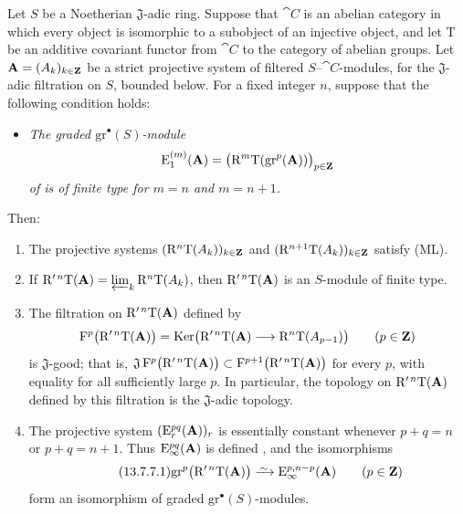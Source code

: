 \begin{proposition}[13.7.7]
\label{0.13.7.7}
Let $S$ be a Noetherian $\mathfrak{J}$-adic ring.
Suppose that $\cat{C}$ is an abelian category in which every object
is isomorphic to a subobject of an injective object, and let
$\mathrm{T}$ be an additive covariant functor from $\cat{C}$ to the
category of abelian groups.
Let $\mathbf{A}=(A_k)_{k\in\mathbf{Z}}$ be a
strict projective system of filtered $S$--$\cat{C}$-modules, for the $\mathfrak{J}$-adic
filtration on $S$, bounded below.
For a fixed integer $n$, suppose that the following condition holds:
\begin{itemize}
  \item[$(\mathrm{F}_n)$]
  \emph{The graded $\mathrm{gr}^\bullet(S)$-module}
  \[
    \mathrm{E}_1^{(m)}(\mathbf{A})
    =
    \bigl(
      \mathrm{R}^m\mathrm{T}(\mathrm{gr}^p(\mathbf{A}))
    \bigr)_{p\in\mathbf{Z}}
  \]
  \emph{of  is of finite type for
  $m=n$ and $m=n+1$.}
\end{itemize}
Then:
\begin{enumerate}
  \item[{\rm(i)}] The projective systems
  $(\mathrm{R}^n\mathrm{T}(A_k))_{k\in\mathbf{Z}}$ and
  $(\mathrm{R}^{n+1}\mathrm{T}(A_k))_{k\in\mathbf{Z}}$ satisfy {\rm(ML)}.
  \item[{\rm(ii)}] If $\mathrm{R}'^{\,n}\mathrm{T}(\mathbf{A})
=
\varprojlim_k\mathrm{R}^n\mathrm{T}(A_k)$,
  then $\mathrm{R}'^{\,n}\mathrm{T}(\mathbf{A})$ is an $S$-module of finite
  type.
  \item[{\rm(iii)}] The filtration on
  $\mathrm{R}'^{\,n}\mathrm{T}(\mathbf{A})$ defined by
  \[
    \mathrm{F}^p\bigl(\mathrm{R}'^{\,n}\mathrm{T}(\mathbf{A})\bigr)
    =
    \operatorname{Ker}\bigl(
      \mathrm{R}'^{\,n}\mathrm{T}(\mathbf{A})
      \longrightarrow
      \mathrm{R}^n\mathrm{T}(A_{p-1})
    \bigr)
    \qquad(p\in\mathbf{Z})
  \]
  is $\mathfrak{J}$-good; that is, $\mathfrak{J}\,
\mathrm{F}^p\bigl(\mathrm{R}'^{\,n}\mathrm{T}(\mathbf{A})\bigr)
\subset
\mathrm{F}^{p+1}\bigl(\mathrm{R}'^{\,n}\mathrm{T}(\mathbf{A})\bigr)$
  for every $p$, with equality for all sufficiently large $p$.
  In particular, the topology on
  $\mathrm{R}'^{\,n}\mathrm{T}(\mathbf{A})$ defined by this filtration is the
  $\mathfrak{J}$-adic topology.
  \item[{\rm(iv)}] The projective system
  $(\mathrm{E}_r^{pq}(\mathbf{A}))_r$ is essentially constant whenever
  $p+q=n$ or $p+q=n+1$.
  Thus $\mathrm{E}_\infty^{pq}(\mathbf{A})$ is defined
  , and the isomorphisms
  \begin{equation}
  \label{0.13.7.7.1}
  \tag{13.7.7.1}
    \mathrm{gr}^p\bigl(\RR'^{\,n}\mathrm{T}(\bb{A})\bigr)
    \isoto
    \mathrm{E}_\infty^{p,n-p}(\bb{A})
    \qquad(p\in\bb{Z})
  \end{equation}
  form an isomorphism of graded
  $\mathrm{gr}^\bullet(S)$-modules.
\end{enumerate}
\end{proposition}

